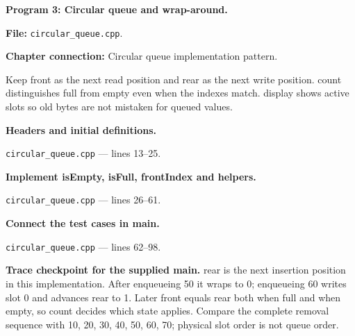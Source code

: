 \textbf{Program 3: Circular queue and wrap-around.}

\textbf{File:} \texttt{circular\_queue.cpp}.

\textbf{Chapter connection:} Circular queue implementation pattern.

Keep front as the next read position and rear as the next write position. count distinguishes full from empty even when the indexes match. display shows active slots so old bytes are not mistaken for queued values.



\begin{utpsteps}\setcounter{enumi}{0}\item \textbf{Headers and initial definitions.}\end{utpsteps}

\texttt{circular\_queue.cpp} --- lines 13--25.




\tcbbreak

\begin{utpsteps}\setcounter{enumi}{1}\item \textbf{Implement isEmpty, isFull, frontIndex and helpers.}\end{utpsteps}

\texttt{circular\_queue.cpp} --- lines 26--61.






\tcbbreak

\begin{utpsteps}\setcounter{enumi}{2}\item \textbf{Connect the test cases in main.}\end{utpsteps}

\texttt{circular\_queue.cpp} --- lines 62--98.

\textbf{Trace checkpoint for the supplied main.} rear is the next insertion position in this implementation. After enqueueing 50 it wraps to 0; enqueueing 60 writes slot 0 and advances rear to 1. Later front equals rear both when full and when empty, so count decides which state applies. Compare the complete removal sequence with 10, 20, 30, 40, 50, 60, 70; physical slot order is not queue order.




